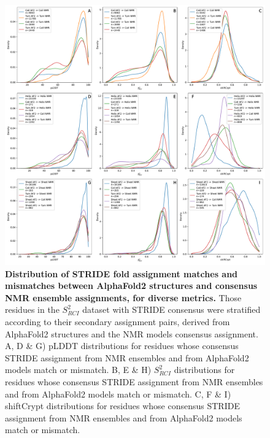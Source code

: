 \begin{figure}[H]
    \centering
    \includegraphics[width=\textwidth]{pLDDT/plddt_figures/all_switchers_ss_af_stride_consensus_af_stride_af_ss_nmr_strideCons.pdf}
        \caption{\textbf{Distribution of STRIDE fold assignment matches and mismatches between AlphaFold2 structures and consensus NMR ensemble assignments, for diverse metrics.} Those residues in the \(S^{2}_{RCI}\) dataset with STRIDE consensus were stratified according to their secondary assignment pairs, derived from AlphaFold2 structures and the NMR models consensus assignment. A, D \& G) pLDDT distributions for residues whose consensus STRIDE assignment from NMR ensembles and from AlphaFold2 models match or mismatch. B, E \& H) \(S^{2}_{RCI}\) distributions for residues whose consensus STRIDE assignment from NMR ensembles and from AlphaFold2 models match or mismatch. C, F \& I) shiftCrypt distributions for residues whose consensus STRIDE assignment from NMR ensembles and from AlphaFold2 models match or mismatch.}
    \label{fig:af2_nmr_fold_missmatch}
\end{figure}


